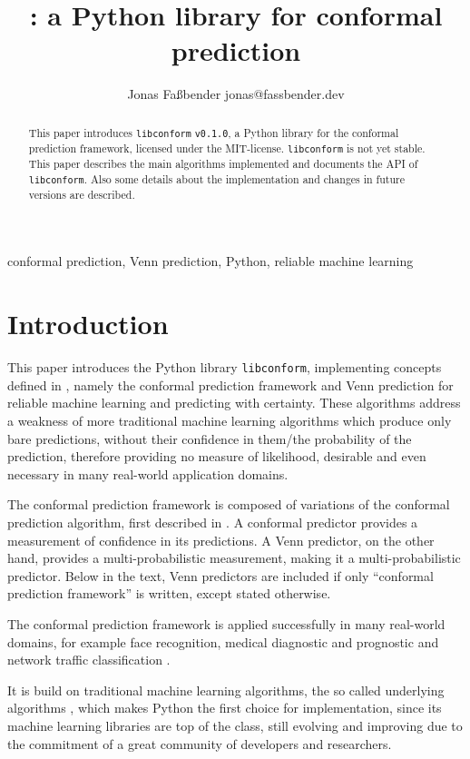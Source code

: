 \documentclass[twoside,11pt]{article}
\title{\libconform{} \version: a Python library for
       conformal prediction}
\author{\name Jonas Fa{\ss}bender
        \email jonas@fassbender.dev}
\def\version{\texttt{v0.1.0}}
\def\libconform{\texttt{libconform}}
\begin{document}
\maketitle

\begin{abstract}%
This paper introduces \libconform{} \version{}, a Python
library for the conformal prediction framework, licensed
under the MIT-license.
\libconform{} is not yet stable.
This paper describes the main algorithms implemented and
documents the API of \libconform{}.
Also some details about the implementation and changes in
future versions are described.
\end{abstract}

\begin{keywords}
conformal prediction, Venn prediction, Python,
reliable machine learning
\end{keywords}


\section{Introduction}

This paper introduces the Python library \libconform,
implementing concepts defined in \citet{alrw}, namely the
conformal prediction framework and Venn prediction for
reliable machine learning and predicting with certainty.
These algorithms address a weakness of more traditional
machine learning algorithms which produce only bare
predictions, without their confidence in them/the
probability of the prediction, therefore providing no
measure of likelihood, desirable and even necessary in many
real-world application domains.

The conformal prediction framework is composed of
variations of the conformal prediction algorithm,
first described in
\citet{vovk_et_al_1999, saunders_et_al_1999}.
A conformal predictor provides a measurement of confidence
in its predictions.
A Venn predictor, on the other hand, provides a
multi-probabilistic measurement, making it a
multi-probabilistic predictor.
Below in the text, Venn predictors are included if only
``conformal prediction framework'' is written, except
stated otherwise.

The conformal prediction framework is applied successfully
in many real-world domains, for example face recognition,
medical diagnostic and prognostic and network traffic
classification \citep[see][Part 3]{cprml}.

It is build on traditional machine learning algorithms, the
so called underlying algorithms
\citep[see][]{papadopoulos_et_al_2007}, which makes Python
the first choice for implementation, since its machine
learning libraries are top of the class, still evolving and
improving due to the commitment of a great community of
developers and researchers.
\end{document}
